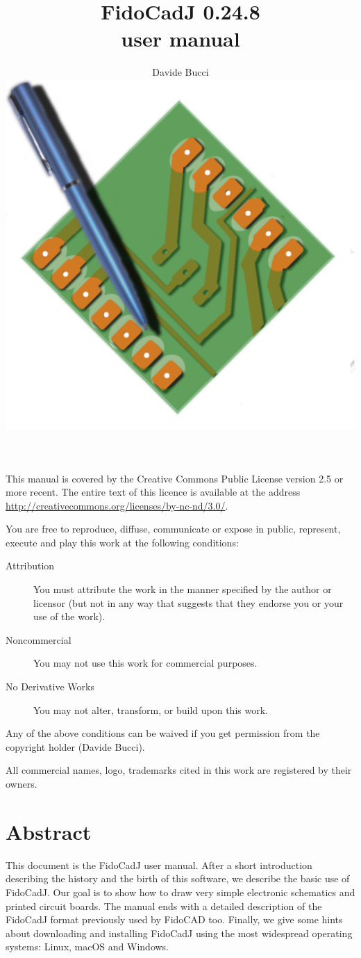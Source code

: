 \documentclass[10pt,a4paper,twoside]{scrreprt}
\title{\Huge\color{webbrown} FidoCadJ 0.24.8 \\ user manual}
\author{Davide Bucci\\[3em]
\includegraphics[width=.7\textwidth]{icona_fidocadj_a}
}
\begin{document}

\maketitle

\clearpage

\clearpage{}  This manual is covered
by the Creative Commons Public License version 2.5 or more recent.
The entire text of this licence is available at the address\\
 \href{http://creativecommons.org/licenses/by-nc-nd/3.0/}{http://creativecommons.org/licenses/by-nc-nd/3.0/}.

You are free to reproduce, diffuse, communicate or expose in public,
represent, execute and play this work at the following conditions:
\begin{description}
\item [{Attribution}] {You must attribute the work in the manner specified
by the author or licensor (but not in any way that suggests that they
endorse you or your use of the work).}
\item [{Noncommercial}] {You may not use this work for commercial purposes.}
\item [{No Derivative Works}] {You may not alter, transform, or build
upon this work.}
\end{description}
Any of the above conditions can be waived if you get permission from
the copyright holder (Davide Bucci). \vfill{}


All commercial names, logo, trademarks cited in this work are registered
by their owners.

\begingroup %


\chapter*{Abstract}

This document is the FidoCadJ user manual. After a short
introduction describing the history and the birth of this software, we
describe the basic use of FidoCadJ. Our goal is to show how to draw
very simple electronic schematics and printed circuit boards.
The manual ends with a detailed description of the FidoCadJ format previously used by FidoCAD too. Finally, we give some hints about downloading and installing FidoCadJ using the most widespread operating systems: Linux, macOS and Windows.
\end{document}
